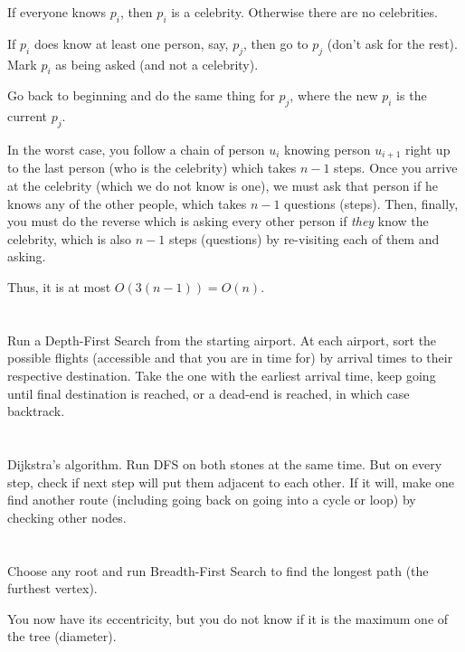 \documentclass[11pt,letterpaper]{article}
\begin{document}
	If everyone knows $p_i$, then $p_i$ is a celebrity.
	Otherwise there are no celebrities.\newline
	
	If $p_i$ does know at least one person, say, $p_j$, then go to $p_j$ (don't ask for the rest). Mark $p_i$ as being asked (and not a celebrity).\newline
	
	Go back to beginning and do the same thing for $p_j$, where the new $p_i$ is the current $p_j$.\newline
	
	In the worst case, you follow a chain of person $u_i$ knowing person $u_{i+1}$ right up to the last person (who is the celebrity) which takes $n-1$ steps. Once you arrive at the celebrity (which we do not know is one), we must ask that person if he knows any of the other people, which takes $n-1$ questions (steps). Then, finally, you must do the reverse which is asking every other person if \textit{they} know the celebrity, which is also $n-1$ steps (questions) by re-visiting each of them and asking.
	
	Thus, it is at most $O(3(n-1))=O(n)$.
	
	\section{}
	Run a Depth-First Search from the starting airport. At each airport, sort the possible flights (accessible and that you are in time for) by arrival times to their respective destination. Take the one with the earliest arrival time, keep going until final destination is reached, or a dead-end is reached, in which case backtrack.
	
	\section{}
	Dijkstra's algorithm.
	Run DFS on both stones at the same time. But on every step, check if next step will put them adjacent to each other. If it will, make one find another route (including going back on going into a cycle or loop) by checking other nodes.
	
	\section{}
	Choose any root and run Breadth-First Search to find the longest path (the furthest vertex).
	
	You now have its eccentricity, but you do not know if it is the maximum one of the tree (diameter).
	
\end{document}

